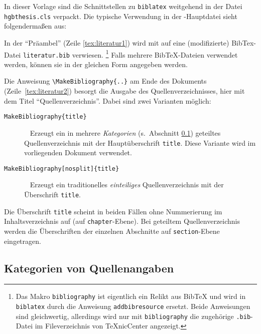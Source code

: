 In dieser Vorlage sind die Schnittstellen zu \texttt{biblatex} weitgehend in der Datei \nolinkurl{hgbthesis.cls} verpackt. Die typische Verwendung in der \latex-Haupt\-datei sieht folgendermaßen aus:
%
%
In der "`Präambel"' (Zeile \ref{tex:literatur1}) wird mit \verb!! 
auf eine (modifizierte) BibTex-Datei \nolinkurl{literatur.bib} verwiesen.%
\footnote{Das Makro 
\texttt{{\bs}bibliography} ist eigentlich ein Relikt aus BibTeX
und wird in \texttt{biblatex} durch die Anweisung \texttt{{\bs}addbibresource} 
ersetzt. Beide Anweisungen sind gleichwertig, allerdings wird nur mit 
\texttt{{\bs}bibliography} die zugehörige \texttt{.bib}-Datei im Fileverzeichnis von TeXnicCenter angezeigt.}
Falls mehrere BibTeX-Dateien verwendet werden, können sie in der gleichen Form angegeben werden.

Die Anweisung \verb!! am Ende des Dokuments (Zeile~\ref{tex:literatur2})
besorgt die Ausgabe des Quellenverzeichnisses, hier mit dem Titel "`Quellenverzeichnis"'.
Dabei sind zwei Varianten möglich:
%
\begin{description}
\item[\texttt{{\bs}MakeBibliography\{title\}}] ~ \newline
   Erzeugt ein in mehrere \emph{Kategorien} (s.\ Abschnitt \ref{sec:BibKategorien}) geteiltes Quellenverzeichnis 
   mit der Hauptüberschrift \texttt{title}. Diese Variante wird im vorliegenden Dokument verwendet.
\item[\texttt{{\bs}MakeBibliography[nosplit]\{title\}}] ~ \newline
   Erzeugt ein traditionelles \emph{einteiliges} Quellenverzeichnis mit der
   Überschrift \texttt{title}. 
\end{description}
%
Die Überschrift \texttt{title} scheint in beiden Fällen ohne Nummerierung 
im Inhaltsverzeichnis auf (auf \texttt{chapter}-Ebene).
Bei geteiltem Quellenverzeichnis werden die Überschriften der einzelnen Abschnitte auf 
\texttt{section}-Ebene eingetragen.


\subsection{Kategorien von Quellenangaben}
\label{sec:BibKategorien}

